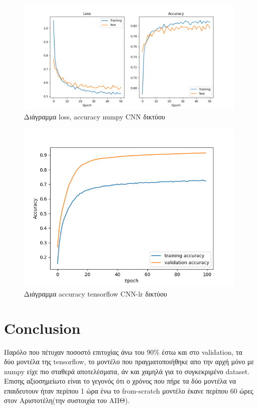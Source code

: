 \begin{figure}[ht]
	\centering
	\includegraphics[width=1\linewidth]{Results/40k_withoutdropout_conv_lr.png}
	\caption{ Διάγραμμα loss, accuracy numpy CNN δικτύου}
	\label{f:g12}	
\end{figure}


\begin{figure}[ht]
	\centering
	\includegraphics[width=1\linewidth]{Results/tensorflow_lr.png}
	\caption{ Διάγραμμα accuracy tensorflow CNN-lr δικτύου}
	\label{f:g13}	
\end{figure}
\clearpage

\section{Conclusion}
Παρόλο που πέτυχαν ποσοστό επιτυχίας άνω του 90$\%$ έστω και στο validation, τα δύο μοντέλα της tensorflow, το μοντέλο που πραγματοποιήθηκε απο την αρχή μόνο με numpy είχε πιο σταθερά αποτελέσματα, άν και χαμηλά για το συγκεκριμένο dataset. Επισης αξιοσημείωτο είναι το γεγονός ότι ο χρόνος που πήρε τα δύο μοντέλα να επαιδευτουν ήταν περίπου 1 ώρα ένω το from-scratch μοντέλο έκανε περίπου 60 ώρες στον Αριστοτέλη(την συστοιχία του ΑΠΘ). 
